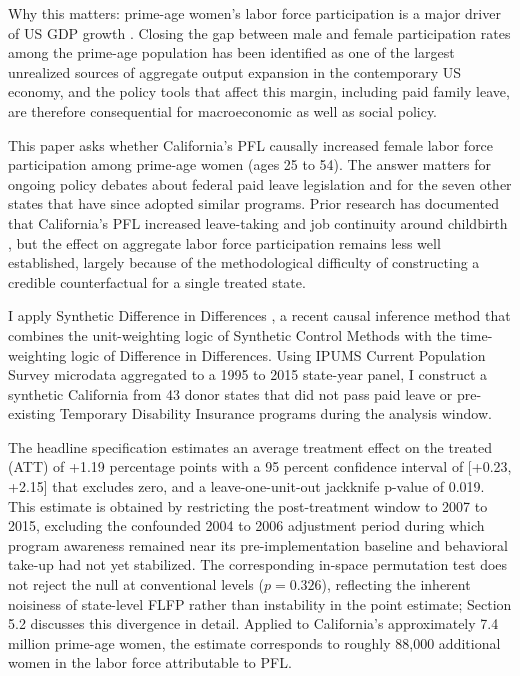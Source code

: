 \documentclass[12pt, letterpaper]{article}
\begin{document}
Why this matters: prime-age women's labor force participation is a major driver of US GDP growth \citep{yellen2024, cap2024}. Closing the gap between male and female participation rates among the prime-age population has been identified as one of the largest unrealized sources of aggregate output expansion in the contemporary US economy, and the policy tools that affect this margin, including paid family leave, are therefore consequential for macroeconomic as well as social policy.

This paper asks whether California's PFL causally increased female labor force participation among prime-age women (ages 25 to 54). The answer matters for ongoing policy debates about federal paid leave legislation and for the seven other states that have since adopted similar programs. Prior research has documented that California's PFL increased leave-taking \citep{rossin2013, baum2016} and job continuity around childbirth \citep{bailey2019}, but the effect on aggregate labor force participation remains less well established, largely because of the methodological difficulty of constructing a credible counterfactual for a single treated state.

I apply Synthetic Difference in Differences \citep{arkhangelsky2021}, a recent causal inference method that combines the unit-weighting logic of Synthetic Control Methods \citep{abadie2010} with the time-weighting logic of Difference in Differences. Using IPUMS Current Population Survey microdata aggregated to a 1995 to 2015 state-year panel, I construct a synthetic California from 43 donor states that did not pass paid leave or pre-existing Temporary Disability Insurance programs during the analysis window.

The headline specification estimates an average treatment effect on the treated (ATT) of +1.19 percentage points with a 95 percent confidence interval of [+0.23, +2.15] that excludes zero, and a leave-one-unit-out jackknife p-value of 0.019. This estimate is obtained by restricting the post-treatment window to 2007 to 2015, excluding the confounded 2004 to 2006 adjustment period during which program awareness remained near its pre-implementation baseline and behavioral take-up had not yet stabilized. The corresponding in-space permutation test does not reject the null at conventional levels ($p = 0.326$), reflecting the inherent noisiness of state-level FLFP rather than instability in the point estimate; Section 5.2 discusses this divergence in detail. Applied to California's approximately 7.4 million prime-age women, the estimate corresponds to roughly 88,000 additional women in the labor force attributable to PFL.
\end{document}
